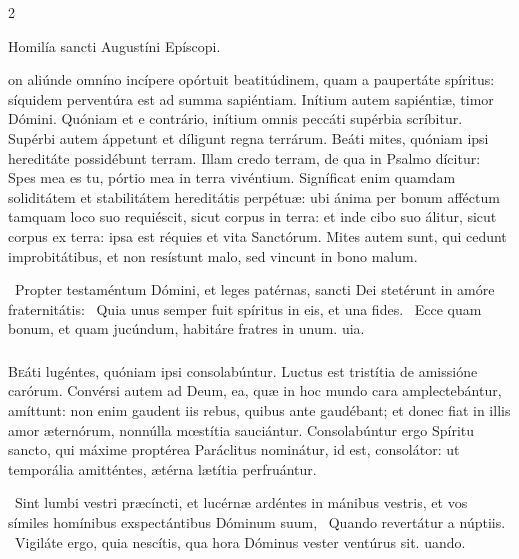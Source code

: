 \documentclass[9pt,twoside]{extarticle}
\begin{document}
\begin{multicols}{2}
\begin{center}Homilía sancti Augustíni Epíscopi.\\ \end{center}
on aliúnde omníno incípere opórtuit beatitúdinem, quam a paupertáte spíritus: síquidem perventúra est ad summa sapiéntiam. Inítium autem sapiéntiæ, timor Dómini. Quóniam et e contrário, inítium omnis peccáti supérbia scríbitur. Supérbi autem áppetunt et díligunt regna terrárum. Beáti mites, quóniam ipsi hereditáte possidébunt terram. Illam credo terram, de qua in Psalmo dícitur: Spes mea es tu, pórtio mea in terra vivéntium. Signíficat enim quamdam soliditátem et stabilitátem hereditátis perpétuæ: ubi ánima per bonum afféctum tamquam loco suo requiéscit, sicut corpus in terra: et inde cibo suo álitur, sicut corpus ex terra: ipsa est réquies et vita Sanctórum. Mites autem sunt, qui cedunt improbitátibus, et non resístunt malo, sed vincunt in bono malum.

\begin{tightlist}{}
\item {}~Propter testaméntum Dómini, et leges patérnas, sancti Dei stetérunt in amóre fraternitátis: \textred{*}~Quia unus semper fuit spíritus in eis, et una fides.
~Ecce quam bonum, et quam jucúndum, habitáre fratres in unum. uia.
\end{tightlist}

\subsubsection*{\center {}}
\lettrine{B}eáti lugéntes, quóniam ipsi consolabúntur. Luctus est tristítia de amissióne carórum. Convérsi autem ad Deum, ea, quæ in hoc mundo cara amplectebántur, amíttunt: non enim gaudent iis rebus, quibus ante gaudébant; et donec fiat in illis amor æternórum, nonnúlla mœstítia sauciántur. Consolabúntur ergo Spíritu sancto, qui máxime proptérea Paráclitus nominátur, id est, consolátor: ut temporália amitténtes, ætérna lætítia perfruántur.

\begin{tightlist}{}
\item {}~Sint lumbi vestri præcíncti, et lucérnæ ardéntes in mánibus vestris, et vos símiles homínibus exspectántibus Dóminum suum, \textred{*}~Quando revertátur a núptiis.
~Vigiláte ergo, quia nescítis, qua hora Dóminus vester ventúrus sit. uando.
\end{tightlist}


\end{multicols}
\end{document}
